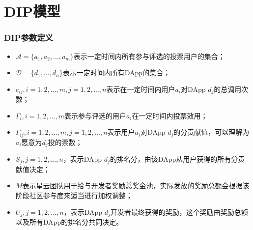
\section{DIP模型}
\begin{frame}
\frametitle{DIP参数定义}
\begin{itemize}
	\item $\mathcal{A}=\{a_1,a_2,...,a_m\}$表示一定时间内所有参与评选的投票用户的集合；
	\item $\mathcal{D}=\{d_1,...,d_n\}$表示一定时间内所有DApp的集合；
	\item $e_{ij},i=1,2,...,m, j=1,2,...,n$表示在一定时间内用户$a_i$对DApp $d_j$的总调用次数；
	\item $\Gamma_i, i=1,2,...,m$表示参与评选的用户$a_i$在一定时间内投票效用；
	\item $\Gamma_{ij}, i=1,2,...,m,j=1,2,...,n$表示用户$a_i$对DApp $d_j$的分贡献值，可以理解为$a_i$愿意为$d_j$投的票数；%
	\item $S_j, j=1,2,...,n$，表示DApp $d_j$的排名分，由该DApp从用户获得的所有分贡献值决定；
	\item $M$表示星云团队用于给与开发者奖励总奖金池，实际发放的奖励总额会根据该阶段社区参与度来适当进行加权调整；
	\item $U_j, j=1,2,...,n$，表示DApp $d_j$开发者最终获得的奖励，这个奖励由奖励总额以及所有DApp的排名分共同决定。
\end{itemize}
\end{frame}


